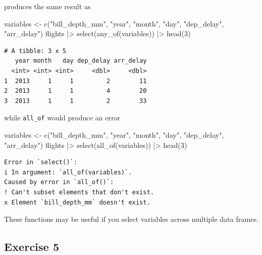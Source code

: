 \documentclass[
  letterpaper,
  DIV=11,
  numbers=noendperiod]{scrreprt}
\newenvironment{Shaded}{\begin{snugshade}}{\end{snugshade}}
\newcommand{\DecValTok}[1]{\textcolor[rgb]{0.68,0.00,0.00}{#1}}
\newcommand{\FunctionTok}[1]{\textcolor[rgb]{0.28,0.35,0.67}{#1}}
\newcommand{\NormalTok}[1]{\textcolor[rgb]{0.00,0.23,0.31}{#1}}
\newcommand{\OtherTok}[1]{\textcolor[rgb]{0.00,0.23,0.31}{#1}}
\newcommand{\SpecialCharTok}[1]{\textcolor[rgb]{0.37,0.37,0.37}{#1}}
\newcommand{\StringTok}[1]{\textcolor[rgb]{0.13,0.47,0.30}{#1}}
\begin{document}
produces the same result as

\begin{Shaded}
\begin{Highlighting}[]
\NormalTok{variables }\OtherTok{\textless{}{-}} \FunctionTok{c}\NormalTok{(}\StringTok{"bill\_depth\_mm"}\NormalTok{, }\StringTok{"year"}\NormalTok{, }\StringTok{"month"}\NormalTok{, }\StringTok{"day"}\NormalTok{, }\StringTok{"dep\_delay"}\NormalTok{, }\StringTok{"arr\_delay"}\NormalTok{)}
\NormalTok{flights }\SpecialCharTok{|\textgreater{}}
  \FunctionTok{select}\NormalTok{(}\FunctionTok{any\_of}\NormalTok{(variables)) }\SpecialCharTok{|\textgreater{}}
  \FunctionTok{head}\NormalTok{(}\DecValTok{3}\NormalTok{)}
\end{Highlighting}
\end{Shaded}

\begin{verbatim}
# A tibble: 3 x 5
   year month   day dep_delay arr_delay
  <int> <int> <int>     <dbl>     <dbl>
1  2013     1     1         2        11
2  2013     1     1         4        20
3  2013     1     1         2        33
\end{verbatim}

while \texttt{all\_of} would produce an error

\begin{Shaded}
\begin{Highlighting}[]
\NormalTok{variables }\OtherTok{\textless{}{-}} \FunctionTok{c}\NormalTok{(}\StringTok{"bill\_depth\_mm"}\NormalTok{, }\StringTok{"year"}\NormalTok{, }\StringTok{"month"}\NormalTok{, }\StringTok{"day"}\NormalTok{, }\StringTok{"dep\_delay"}\NormalTok{, }\StringTok{"arr\_delay"}\NormalTok{)}
\NormalTok{flights }\SpecialCharTok{|\textgreater{}}
  \FunctionTok{select}\NormalTok{(}\FunctionTok{all\_of}\NormalTok{(variables)) }\SpecialCharTok{|\textgreater{}}
  \FunctionTok{head}\NormalTok{(}\DecValTok{3}\NormalTok{)}
\end{Highlighting}
\end{Shaded}

\begin{verbatim}
Error in `select()`:
i In argument: `all_of(variables)`.
Caused by error in `all_of()`:
! Can't subset elements that don't exist.
x Element `bill_depth_mm` doesn't exist.
\end{verbatim}

These functions may be useful if you select variables across multiple
data frames.

\subsection{Exercise 5}\label{exercise-5-3}
\end{document}
